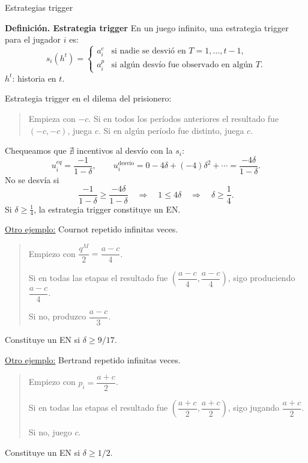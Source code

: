 \documentclass[11pt,a4paper]{article}
\makeatletter
\renewcommand\subsection{\@startsection{subsection}{2}{\z@}{-0.7em}{0.25em}
 {\normalfont\normalsize\bfseries\color{inkred}}}
\newenvironment{apuntebox}[1]{\begin{tcolorbox}[colback=palered,colframe=inkred,
 boxrule=0.7pt,arc=0mm,left=0.8em,right=0.8em,top=0.45em,bottom=0.45em]
 \textcolor{inkred}{\textbf{#1}}\quad}{\end{tcolorbox}}
\newcommand{\rojo}[1]{\textcolor{inkred}{#1}}
\newcommand{\gris}[1]{\textcolor{pencilgray}{#1}}
\makeatother
\begin{document}
\subsection{Estrategias trigger}
\begin{apuntebox}{Definición. Estrategia trigger} En un juego infinito, una \rojo{estrategia trigger} para el jugador $i$ es:
\[
s_i(h^t)=
\begin{cases}
a_i^c &\text{si nadie se desvió en }T=1,\ldots,t-1,\\
a_i^p &\text{si algún desvío fue observado en algún }T.
\end{cases}
\]
\gris{$h^t$: historia en $t$.}
\end{apuntebox}
Estrategia trigger en el dilema del prisionero:
\begin{quote}
Empieza con $-c$. Si en todos los períodos anteriores el resultado fue $(-c,-c)$, juega $c$. Si en algún período fue distinto, juega $c$.
\end{quote}
Chequeamos que $\nexists$ incentivos al desvío con la $s_i$:
\[
u_i^{eq}=\frac{-1}{1-\delta},\qquad
u_i^{\text{desvío}}=0-4\delta+(-4)\delta^2+\cdots=\frac{-4\delta}{1-\delta}.
\]
No se desvía si
\[
\frac{-1}{1-\delta}\geq\frac{-4\delta}{1-\delta}
\quad\Longrightarrow\quad 1\leq4\delta
\quad\Longrightarrow\quad\delta\geq\frac14.
\]
Si $\delta\geq\frac14$, la estrategia trigger constituye un EN.

\underline{Otro ejemplo:} Cournot repetido infinitas veces.
\begin{quote}
Empiezo con $\dfrac{q^M}{2}=\dfrac{a-c}{4}$.

Si en todas las etapas el resultado fue $\left(\dfrac{a-c}{4},\dfrac{a-c}{4}\right)$, sigo produciendo $\dfrac{a-c}{4}$.

Si no, produzco $\dfrac{a-c}{3}$.
\end{quote}
Constituye un EN si $\delta\geq9/17$.

\underline{Otro ejemplo:} Bertrand repetido infinitas veces.
\begin{quote}
Empiezo con $p_i=\dfrac{a+c}{2}$.

Si en todas las etapas el resultado fue $\left(\dfrac{a+c}{2},\dfrac{a+c}{2}\right)$, sigo jugando $\dfrac{a+c}{2}$.

Si no, juego $c$.
\end{quote}
Constituye un EN si $\delta\geq1/2$.
\end{document}
